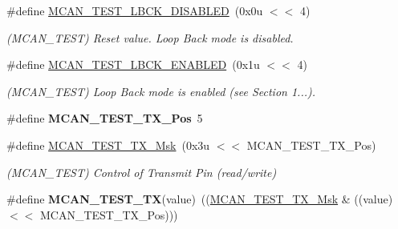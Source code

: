 \begin{DoxyCompactItemize}
\mbox{\label{group__SAME70__MCAN_ga5ab0d2483ea509b113b3df1a22f730fc}} 
\#define \mbox{\hyperlink{group__SAME70__MCAN_ga5ab0d2483ea509b113b3df1a22f730fc}{M\+C\+A\+N\+\_\+\+T\+E\+S\+T\+\_\+\+L\+B\+C\+K\+\_\+\+D\+I\+S\+A\+B\+L\+ED}}~(0x0u $<$$<$ 4)
\begin{DoxyCompactList}\small\item\em (M\+C\+A\+N\+\_\+\+T\+E\+ST) Reset value. Loop Back mode is disabled. \end{DoxyCompactList}\item 
\mbox{\label{group__SAME70__MCAN_gae65b49517f2d9b494a75c03c69153c21}} 
\#define \mbox{\hyperlink{group__SAME70__MCAN_gae65b49517f2d9b494a75c03c69153c21}{M\+C\+A\+N\+\_\+\+T\+E\+S\+T\+\_\+\+L\+B\+C\+K\+\_\+\+E\+N\+A\+B\+L\+ED}}~(0x1u $<$$<$ 4)
\begin{DoxyCompactList}\small\item\em (M\+C\+A\+N\+\_\+\+T\+E\+ST) Loop Back mode is enabled (see Section 1...). \end{DoxyCompactList}\item 
\mbox{\label{group__SAME70__MCAN_ga8c7b16e2338b9abc825a41a67d7e1bce}} 
\#define {\bfseries M\+C\+A\+N\+\_\+\+T\+E\+S\+T\+\_\+\+T\+X\+\_\+\+Pos}~5
\item 
\mbox{\label{group__SAME70__MCAN_ga477ca179082b2acbc9d5257429d1b1e2}} 
\#define \mbox{\hyperlink{group__SAME70__MCAN_ga477ca179082b2acbc9d5257429d1b1e2}{M\+C\+A\+N\+\_\+\+T\+E\+S\+T\+\_\+\+T\+X\+\_\+\+Msk}}~(0x3u $<$$<$ M\+C\+A\+N\+\_\+\+T\+E\+S\+T\+\_\+\+T\+X\+\_\+\+Pos)
\begin{DoxyCompactList}\small\item\em (M\+C\+A\+N\+\_\+\+T\+E\+ST) Control of Transmit Pin (read/write) \end{DoxyCompactList}\item 
\mbox{\label{group__SAME70__MCAN_gaf1222678cecca40c1ddbf9cdb3d7c0d2}} 
\#define {\bfseries M\+C\+A\+N\+\_\+\+T\+E\+S\+T\+\_\+\+TX}(value)~((\mbox{\hyperlink{group__SAMV71__MCAN_ga477ca179082b2acbc9d5257429d1b1e2}{M\+C\+A\+N\+\_\+\+T\+E\+S\+T\+\_\+\+T\+X\+\_\+\+Msk}} \& ((value) $<$$<$ M\+C\+A\+N\+\_\+\+T\+E\+S\+T\+\_\+\+T\+X\+\_\+\+Pos)))
\item 
\mbox{\label{group__SAME70__MCAN_ga83ede71429fcf85f18c460916b63852a}} 

\end{DoxyCompactItemize}

